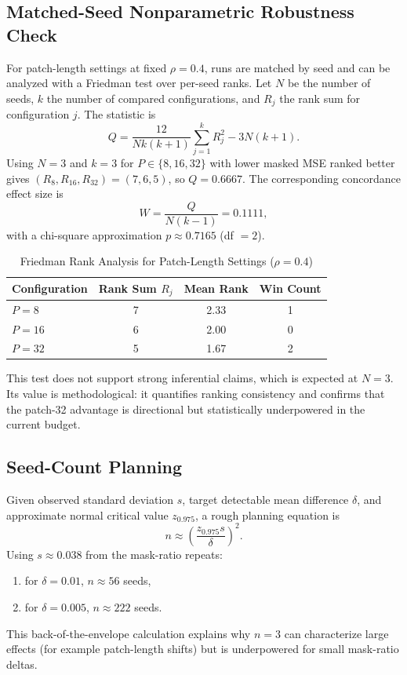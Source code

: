 \documentclass[conference]{IEEEtran}
\begin{document}
\subsection{Matched-Seed Nonparametric Robustness Check}
For patch-length settings at fixed $\rho=0.4$, runs are matched by seed and can be analyzed with a Friedman test over per-seed ranks. Let $N$ be the number of seeds, $k$ the number of compared configurations, and $R_j$ the rank sum for configuration $j$. The statistic is
\begin{equation}
Q = \frac{12}{Nk(k+1)}\sum_{j=1}^{k}R_j^2 - 3N(k+1).
\label{eq:friedman}
\end{equation}
Using $N=3$ and $k=3$ for $P\in\{8,16,32\}$ with lower masked MSE ranked better gives $(R_8,R_{16},R_{32})=(7,6,5)$, so $Q=0.6667$. The corresponding concordance effect size is
\begin{equation}
W = \frac{Q}{N(k-1)} = 0.1111,
\label{eq:kendall_w}
\end{equation}
with a chi-square approximation $p\approx0.7165$ (df $=2$).

\begin{table}[t]
\caption{Friedman Rank Analysis for Patch-Length Settings ($\rho=0.4$)}
\label{tab:friedman_patch}
\centering
\begin{tabular}{lccc}
\toprule
Configuration & Rank Sum $R_j$ & Mean Rank & Win Count \\
\midrule
$P=8$  & 7 & 2.33 & 1 \\
$P=16$ & 6 & 2.00 & 0 \\
$P=32$ & 5 & 1.67 & 2 \\
\bottomrule
\end{tabular}
\end{table}

This test does not support strong inferential claims, which is expected at $N=3$. Its value is methodological: it quantifies ranking consistency and confirms that the patch-32 advantage is directional but statistically underpowered in the current budget.

\subsection{Seed-Count Planning}
Given observed standard deviation $s$, target detectable mean difference $\delta$, and approximate normal critical value $z_{0.975}$, a rough planning equation is
\begin{equation}
n \approx \left(\frac{z_{0.975} s}{\delta}\right)^2.
\label{eq:seed_plan}
\end{equation}
Using $s\approx0.038$ from the mask-ratio repeats:
\begin{enumerate}
    \item for $\delta=0.01$, $n\approx56$ seeds,
    \item for $\delta=0.005$, $n\approx222$ seeds.
\end{enumerate}
This back-of-the-envelope calculation explains why $n=3$ can characterize large effects (for example patch-length shifts) but is underpowered for small mask-ratio deltas.
\end{document}
